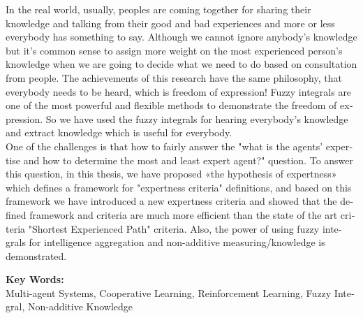 \begin{latin}
\bgroup
In the real world, usually, peoples are coming together for sharing their knowledge and talking from their good and bad experiences and more or less everybody has something to say. Although we cannot ignore anybody's knowledge but it's common sense to assign more weight on the most experienced person's knowledge when we are going to decide what we need to do based on consultation from people. The achievements of this research have the same philosophy, that everybody needs to be heard, which is freedom of expression! Fuzzy integrals are one of the most powerful and flexible methods to demonstrate the freedom of expression. So we have used the fuzzy integrals for hearing everybody's knowledge and extract knowledge which is useful for everybody.\\
\indent One of the challenges is that how to fairly answer the "what is the agents' expertise and how to determine the most and least expert agent?" question. To answer this question, in this thesis, we have proposed «the hypothesis of expertness» which defines a framework for "expertness criteria" definitions, and based on this framework we have introduced a new expertness criteria and showed that the defined framework and criteria are much more efficient than the state of the art criteria "Shortest Experienced Path" criteria. Also, the power of using fuzzy integrals for intelligence aggregation and non-additive measuring/knowledge is demonstrated.
\egroup

\vspace{0.5 cm}

\noindent \textbf{Key Words:}\\ Multi-agent Systems, Cooperative Learning, Reinforcement Learning, Fuzzy Integral, Non-additive Knowledge

\end{latin}